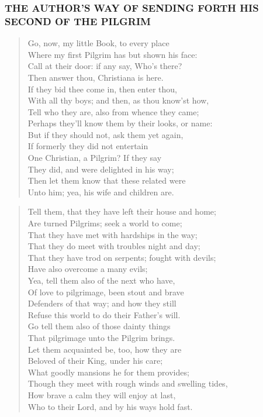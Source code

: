 \newpage
\subsubsection[SENDING FORTH]{THE AUTHOR'S WAY OF SENDING FORTH HIS SECOND  OF THE PILGRIM}
\begin{verse}
Go, now, my little Book, to every place\\
Where my first Pilgrim has but shown his face:\\
Call at their door: if any say, Who's there?\\
Then answer thou, Christiana is here.\\
If they bid thee come in, then enter thou,\\
With all thy boys; and then, as thou know'st how,\\
Tell who they are, also from whence they came;\\
Perhaps they'll know them by their looks, or name:\\
But if they should not, ask them yet again,\\
If formerly they did not entertain\\
One Christian, a Pilgrim? If they say\\
They did, and were delighted in his way;\\
Then let them know that these related were\\
Unto him; yea, his wife and children are.\\
\end{verse}
\begin{verse}
Tell them, that they have left their house and home;\\
Are turned Pilgrims; seek a world to come;\\
That they have met with hardships in the way;\\
That they do meet with troubles night and day;\\
That they have trod on serpents; fought with devils;\\
Have also overcome a many evils;\\
Yea, tell them also of the next who have,\\
Of love to pilgrimage, been stout and brave\\
Defenders of that way; and how they still\\
Refuse this world to do their Father's will.\\
Go tell them also of those dainty things\\
That pilgrimage unto the Pilgrim brings.\\
Let them acquainted be, too, how they are\\
Beloved of their King, under his care;\\
What goodly mansions he for them provides;\\
Though they meet with rough winds and swelling tides,\\
How brave a calm they will enjoy at last,\\
Who to their Lord, and by his ways hold fast.\\
\end{verse}
